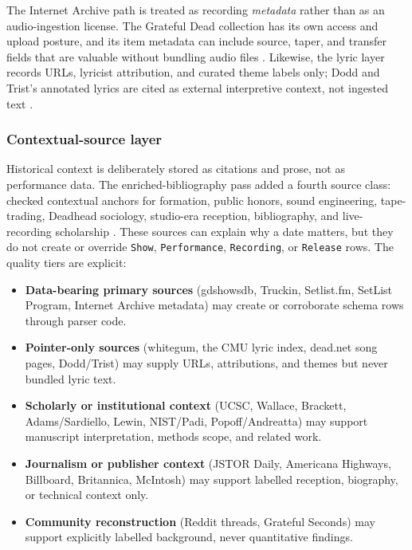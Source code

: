 \documentclass[
]{article}
\providecommand{\tightlist}{%
  \setlength{\itemsep}{0pt}\setlength{\parskip}{0pt}}
\begin{document}
The Internet Archive path is treated as recording \emph{metadata} rather
than as an audio-ingestion license. The Grateful Dead collection has its
own access and upload posture, and its item metadata can include source,
taper, and transfer fields that are valuable without bundling audio
files \citep{internet_archive_gd_collection_policy}. Likewise, the lyric
layer records URLs, lyricist attribution, and curated theme labels only;
Dodd and Trist's annotated lyrics are cited as external interpretive
context, not ingested text \citep{dodd_annotated_lyrics}.

\subsubsection{Contextual-source layer}\label{contextual-source-layer}

Historical context is deliberately stored as citations and prose, not as
performance data. The enriched-bibliography pass added a fourth source
class: checked contextual anchors for formation, public honors, sound
engineering, tape-trading, Deadhead sociology, studio-era reception,
bibliography, and live-recording scholarship
\citep{dead_net_biography, foundsf_weir_psychedelic_sf, smithsonian_institutionally_dead, mcintosh_wall_of_sound, marshall_bootleg_collectors, brackett_live_dead, adams_deadhead_social_science, dodd_weiner_annotated_bibliography, americana_highways_workingmans_american_beauty, kennedy_center_honors_2024}.
These sources can explain why a date matters, but they do not create or
override \texttt{Show}, \texttt{Performance}, \texttt{Recording}, or
\texttt{Release} rows. The quality tiers are explicit:

\begin{itemize}
\tightlist
\item
  \textbf{Data-bearing primary sources} (gdshowsdb, Truckin, Setlist.fm,
  SetList Program, Internet Archive metadata) may create or corroborate
  schema rows through parser code.
\item
  \textbf{Pointer-only sources} (whitegum, the CMU lyric index, dead.net
  song pages, Dodd/Trist) may supply URLs, attributions, and themes but
  never bundled lyric text.
\item
  \textbf{Scholarly or institutional context} (UCSC, Wallace, Brackett,
  Adams/Sardiello, Lewin, NIST/Padi, Popoff/Andreatta) may support
  manuscript interpretation, methods scope, and related work.
\item
  \textbf{Journalism or publisher context} (JSTOR Daily, Americana
  Highways, Billboard, Britannica, McIntosh) may support labelled
  reception, biography, or technical context only.
\item
  \textbf{Community reconstruction} (Reddit threads, Grateful Seconds)
  may support explicitly labelled background, never quantitative
  findings.
\end{itemize}
\end{document}
